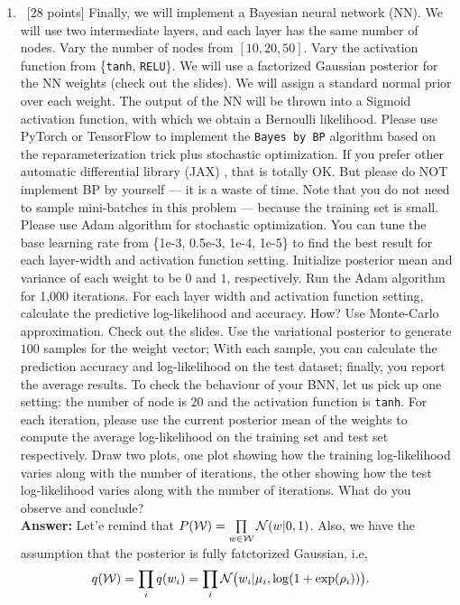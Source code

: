 \documentclass[12pt, fullpage,letterpaper]{article}
\def\red{\color{black!30!red}}
\def\blackblue{\color{black!40!blue}}
\begin{document}
\begin{enumerate}
\begin{enumerate}
\item~[28 points] Finally, we will implement a Bayesian neural network (NN). We will use two intermediate layers, and each layer has the same number of nodes. Vary the number of nodes from $[10, 20, 50]$. Vary the activation function from \{\texttt{tanh}, \texttt{RELU}\}. 	We will use a factorized Gaussian posterior for the NN weights (check out the slides). We will assign a standard normal prior over each weight. The output of the NN will be thrown into a Sigmoid activation function, with which we obtain a Bernoulli likelihood. Please use PyTorch or TensorFlow to implement the \texttt{Bayes by BP} algorithm based on the reparameterization trick plus stochastic optimization. If you prefer other automatic differential library (\eg JAX) , that is totally OK. But please do NOT  implement BP by yourself --- it is a waste of time. Note that you do not need to sample mini-batches in this problem --- because the training set is small. Please use Adam algorithm for stochastic optimization. You can tune the base learning rate from \{1e-3, 0.5e-3, 1e-4, 1e-5\} to find the best result for each layer-width and activation function setting. Initialize posterior mean and variance of each weight to be $0$ and $1$, respectively. Run the Adam algorithm for 1,000 iterations. For each layer width and activation function setting, calculate the predictive log-likelihood and accuracy. How? Use Monte-Carlo approximation. Check out the slides.  Use the variational posterior to generate $100$ samples for the weight vector; With each sample, you can calculate the prediction accuracy and log-likelihood on the test dataset; finally, you report the average results.  To check the behaviour of your BNN, let us pick up one setting: the number of node is 20 and the activation function is \texttt{tanh}. For each iteration,  please use the current posterior mean of the weights to compute the average log-likelihood on the training set and test set respectively. Draw two plots, one plot showing how the training log-likelihood varies along with the number of iterations, the other showing how the test log-likelihood varies along with the number of iterations. What do you observe and conclude?\\
{\bf \red Answer: }{\blackblue 
Let'e remind that $P(\mathcal{W}) = \prod\limits_{w\in\mathcal{W}}\mathcal{N}(w|0,1)$. Also, 
we have the assumption that the posterior is fully fatctorized Gaussian, i.e, 
\begin{align*}
q(\mathcal{W}) &  = \prod_i q(w_i) = \prod_i \N\big(w_i|\mu_i, \log(1+\exp(\rho_i))\big).

\end{align*}}
\end{enumerate}
\end{enumerate}
\end{document}
